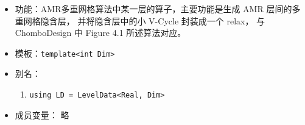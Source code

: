 \documentclass[cn, bibend=bibtex]{elegantpaper}
\theoremstyle{plain}
\begin{document}
\begin{itemize}
  \item 功能：AMR多重网格算法中某一层的算子，主要功能是生成 AMR 层间的多重网格隐含层，
             并将隐含层中的小 V-Cycle 封装成一个 relax，
             与 ChomboDesign 中 Figure 4.1 所述算法对应。
  \item 模板：\lstinline|template<int Dim>|
  \item 别名：
  \begin{enumerate}
      \item \lstinline|using LD = LevelData<Real, Dim>|
  \end{enumerate}
  \item 成员变量： 略

      



      
      


\end{itemize}
\end{document}
